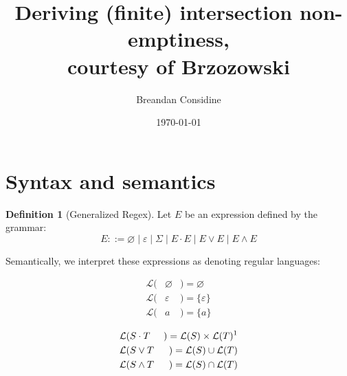 \documentclass[11pt]{article}
\title{Deriving (finite) intersection non-emptiness,\\ courtesy of Brzozowski}
\author{Breandan Considine}
\date{\today}
\theoremstyle{plain}
\theoremstyle{definition}
\newtheorem{definition}{Definition}
\begin{document}
\maketitle

\section{Syntax and semantics}

\begin{definition}[Generalized Regex]
  Let \( E \) be an expression defined by the grammar:
  \[
    E ::= \varnothing \mid \varepsilon \mid \Sigma \mid E \cdot E \mid E \lor E \mid E \land E
  \]

\noindent Semantically, we interpret these expressions as denoting regular languages:\vspace{-1cm}
  \setlength{\columnseprule}{0pt}
  \setlength{\columnsep}{-3cm}
  \begin{multicols}{2}
    \begin{eqnarray*}
      \mathcal{L}(& \varnothing & ) = \varnothing \\
      \mathcal{L}(& \varepsilon & ) = \{\varepsilon\} \\
      \mathcal{L}(& a           & ) = \{a\}\\
    \end{eqnarray*} \break\vspace{-0.45cm}
    \begin{eqnarray*}
      \mathcal{L}(& S\cdot T    & ) = \mathcal{L}(S) \times \mathcal{L}(T)\text{\footnotemark}\\
      \mathcal{L}(& S\vee  T    & ) = \mathcal{L}(S) \cup \mathcal{L}(T)\\
      \mathcal{L}(& S\land T    & ) = \mathcal{L}(S) \cap \mathcal{L}(T)\\
    \end{eqnarray*}
  \end{multicols}
\end{definition}
\end{document}
